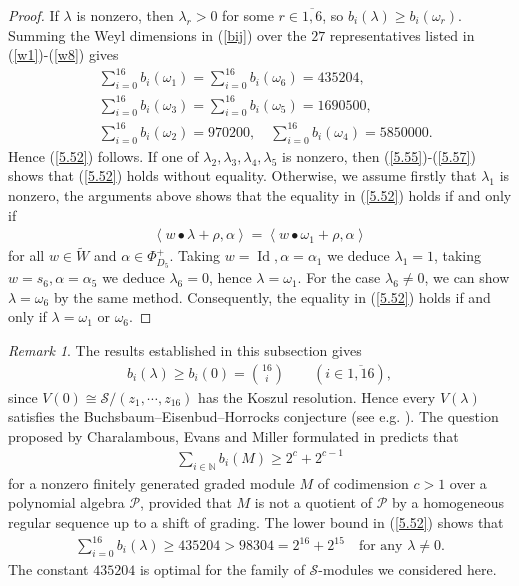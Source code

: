 \documentclass[12pt]{article}
\numberwithin{equation}{section}
\theoremstyle{definition}
\theoremstyle{remark}
\newtheorem{remark}[theorem]{Remark}
\begin{document}
\begin{proof}
	If $\lambda$ is nonzero, then $\lambda_r>0$ for some $r\in\overline{1,6}$, so $b_i(\lambda)\geqslant b_i(\omega_r)$. Summing the Weyl dimensions in (\ref{bij}) over the $27$ representatives listed in (\ref{w1})-(\ref{w8}) gives
	\begin{eqnarray}
		&\sum\limits_{i=0}^{16}b_i(\omega_1)=\sum\limits_{i=0}^{16}b_i(\omega_6)=435204,\label{5.55}\\
		&\sum\limits_{i=0}^{16}b_i(\omega_3)=\sum\limits_{i=0}^{16}b_i(\omega_5)=1690500,\\
		&\sum\limits_{i=0}^{16}b_i(\omega_2)=970200,\quad\sum\limits_{i=0}^{16}b_i(\omega_4)=5850000.\label{5.57}
	\end{eqnarray}
	Hence (\ref{5.52}) follows. If one of $\lambda_2,\lambda_3,\lambda_4,\lambda_5$ is nonzero, then (\ref{5.55})-(\ref{5.57}) shows that (\ref{5.52}) holds without equality.
	Otherwise, we assume firstly that $\lambda_1$ is nonzero, the arguments above shows that the equality in (\ref{5.52}) holds if and only if
	\begin{eqnarray}
		\left\langle w\bullet\lambda+\rho,\alpha\right\rangle=\left\langle w\bullet\omega_1+\rho,\alpha\right\rangle
	\end{eqnarray}
	for all $w\in\widetilde{W}$ and $\alpha\in\Phi^+_{D_5}$. Taking $w=\operatorname{Id},\alpha=\alpha_1$ we deduce $\lambda_1=1$, taking $w=s_6,\alpha=\alpha_5$ we deduce $\lambda_6=0$, hence $\lambda=\omega_1$. For the case $\lambda_6\neq0$, we can show $\lambda=\omega_6$ by the same method. Consequently, the equality in (\ref{5.52}) holds if and only if $\lambda=\omega_1$ or $\omega_6$.
\end{proof}

\begin{remark}
	The results established in this subsection gives
	\begin{eqnarray}
		b_i(\lambda)\geqslant b_i(0)=\binom{16}{i}\qquad (i\in\overline{1,16}),
	\end{eqnarray}
	since $V(0)\cong \mathscr{S}/(z_1,\cdots,z_{16})$ has the Koszul resolution. Hence every $V(\lambda)$ satisfies the Buchsbaum–Eisenbud–Horrocks conjecture (see e.g. \cite[Conjecture 4.1]{BG}). The question proposed by Charalambous, Evans and Miller formulated in \cite[Question B]{BG} predicts that
	\begin{eqnarray}
		\sum_{i\in\mathbb{N}}b_i(M)\geqslant 2^{c}+2^{c-1}
	\end{eqnarray}
	for a nonzero finitely generated graded module $M$ of codimension $c>1$ over a polynomial algebra $\mathscr{P}$, provided that $M$ is not a quotient of $\mathscr{P}$ by a homogeneous regular sequence up to a shift of grading.  The lower bound in (\ref{5.52}) shows that
	\begin{eqnarray}
		\sum_{i=0}^{16}b_i(\lambda)\geqslant 435204>98304=2^{16}+2^{15}\quad\text{for any }\lambda\neq0.
	\end{eqnarray}
	The constant $435204$ is optimal for the family of $\mathscr{S}$-modules we considered here.
\end{remark}
\end{document}
